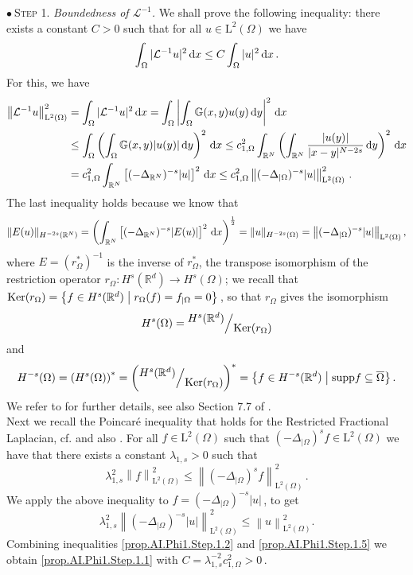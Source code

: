 \documentclass[11pt]{article}
\numberwithin{equation}{section}
\newcommand{\dx}{\,{\rm d}x}
\newcommand{\dy}{\,{\rm d}y}
\def\LL{\mathrm{L}} %
\def\supp{\mathrm{supp}} %
\newcommand{\AI}{\mathcal{L}^{-1}}
\newcommand{\K}{{\mathbb G}}
\newcommand{\RR}{\mathbb{R}}
\def\quotient#1#2{\raise1ex\hbox{$#1$}\Big/\lower1ex\hbox{$#2$}}
\begin{document}
\noindent$\bullet~$\textsc{Step 1. }\textit{Boundedness of $\AI$. }We shall prove the following inequality: there exists a constant $C>0$ such that for all $u\in \LL^2(\Omega)$ we have
\begin{equation}\label{prop.AI.Phi1.Step.1.1}
\int_\Omega |\AI u|^2\dx \le C\int_\Omega |u|^2 \dx\,.
\end{equation}
For this, we have
\begin{equation}\label{prop.AI.Phi1.Step.1.2}\begin{split}
\left\|\AI u\right\|_{\LL^2(\Omega)}^2&=\int_\Omega |\AI u|^2\dx
=\int_\Omega \left|\int_\Omega \K(x,y)u(y)\dy\right|^2\dx\\
&\le \int_\Omega \left(\int_\Omega \K(x,y)|u(y)|\dy\right)^2\dx
\le c_{1,\Omega}^2\int_{\RR^N} \left(\int_{\RR^N} \frac{|u(y)|}{|x-y|^{N-2s}}\dy\right)^2\dx\\
&= c_{1,\Omega}^2\int_{\RR^N} \left[(-\Delta_{\RR^N})^{-s}|u|\right]^2\dx \le c_{1,\Omega}^2\left\|(-\Delta_{|\Omega})^{-s}|u|\right\|_{\LL^2(\Omega)}^2\,.
\end{split}
\end{equation}
The last inequality holds because we know that
\[
\|E(u)\|_{H^{-2s}(\RR^N)}=\left(\int_{\RR^N} \left[(-\Delta_{\RR^N})^{-s}|E(u)|\right]^2\dx\right)^{\frac{1}{2}} = \|u\|_{H^{-2s}(\Omega)}=\left\|(-\Delta_{|\Omega})^{-s}|u|\right\|_{\LL^2(\Omega)},
\]
where $E=(r_\Omega^*)^{-1}$ is the inverse of $r_\Omega^*$,  the transpose isomorphism of the restriction operator
$r_\Omega: H^s(\RR^d)\to H^s(\Omega)$; we recall that  ${\rm Ker}(r_\Omega)=\left\{f\in H^s(\RR^d)\;\big|\; r_\Omega(f)=f_{|\Omega}=0\right\}$\,, so that $r_\Omega$ gives the isomorphism
\[
H^s(\Omega)= \quotient{H^s(\RR^d)}{{\rm Ker}(r_\Omega)}
\]
and
\[
H^{-s}(\Omega)=\left(H^s(\Omega)\right)^*
= \left(\quotient{H^s(\RR^d)}{{\rm Ker}(r_\Omega)}\right)^*=\left\{f\in  H^{-s}(\RR^d) \;\big|\; \supp{f}\subseteq\overline{\Omega} \right\}.
\]
We refer to \cite{LM} for further details, see also Section 7.7 of \cite{BSV2013}.\\
Next we recall the Poincar\'e inequality that holds for the Restricted Fractional Laplacian, cf. \cite{BG, ChSo, SV1} and also \cite{BSV2013,BV-PPR2-1}. For all $f\in \LL^2(\Omega)$ such that $(-\Delta_{|\Omega})^{s} f\in \LL^2(\Omega)$ we have that there exists a constant $\lambda_{1,s}>0$ such that
\begin{equation}\label{prop.AI.Phi1.Step.1.4}
\lambda_{1,s}^2 \left\| f\right\|_{\LL^2(\Omega)}^2\le \left\|(-\Delta_{|\Omega})^{s} f\right\|_{\LL^2(\Omega)}^2 \,.
\end{equation}
We apply the above inequality to $f=(-\Delta_{|\Omega})^{-s}|u|$\,, to get
\begin{equation}\label{prop.AI.Phi1.Step.1.5}
\lambda_{1,s}^2 \left\| (-\Delta_{|\Omega})^{-s}|u|\right\|_{\LL^2(\Omega)}^2\le \left\| u\right\|_{\LL^2(\Omega)}^2.
\end{equation}
Combining inequalities \eqref{prop.AI.Phi1.Step.1.2} and \eqref{prop.AI.Phi1.Step.1.5} we obtain \eqref{prop.AI.Phi1.Step.1.1} with $C=\lambda_{1,s}^{-2}c_{1,\Omega}^2>0$\,.
\end{document}
